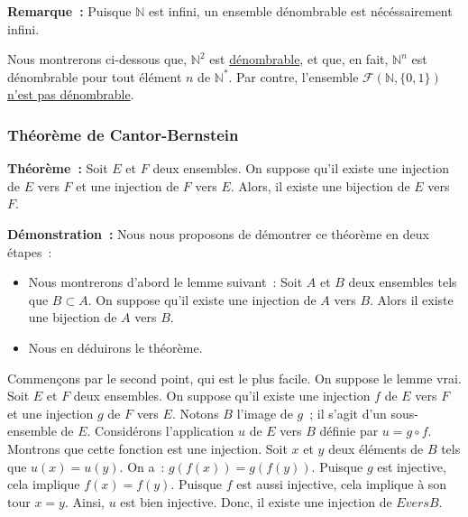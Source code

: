 \medskip

\noindent\textbf{Remarque :} Puisque $\mathbb{N}$ est infini, un ensemble dénombrable est nécéssairement infini.

\medskip

Nous montrerons ci-dessous que, $\mathbb{N}^2$ est \hyperlink{N_to_N2}{dénombrable}, et que, en fait, $\mathbb{N}^n$ est dénombrable pour tout élément $n$ de $\mathbb{N}^*$. 
Par contre, l'ensemble $\mathcal{F}\left( \mathbb{N}, \lbrace 0, 1 \rbrace \right)$ \hyperlink{F_N_0_1_non_denombrable}{n'est pas dénombrable}.

\subsubsection{Théorème de Cantor-Bernstein}

\noindent\textbf{Théorème :} Soit $E$ et $F$ deux ensembles. On suppose qu'il existe une injection de $E$ vers $F$ et une injection de $F$ vers $E$. 
    Alors, il existe une bijection de $E$ vers $F$.

\medskip

\noindent\textbf{Démonstration :} 
    Nous nous proposons de démontrer ce théorème en deux étapes : 
    \begin{itemize}[nosep]
        \item Nous montrerons d'abord le lemme suivant : Soit $A$ et $B$ deux ensembles tels que $B \subset A$. 
            On suppose qu'il existe une injection de $A$ vers $B$. 
            Alors il existe une bijection de $A$ vers $B$. 
        \item Nous en déduirons le théorème.
    \end{itemize}
    
    Commençons par le second point, qui est le plus facile. 
    On suppose le lemme vrai. 
    Soit $E$ et $F$ deux ensembles. 
    On suppose qu'il existe une injection $f$ de $E$ vers $F$ et une injection $g$ de $F$ vers $E$.
    Notons $B$ l'image de $g$ ; il s'agit d'un sous-ensemble de $E$. 
    Considérons l'application $u$ de $E$ vers $B$ définie par $u = g \circ f$. 
    Montrons que cette fonction est une injection. 
    Soit $x$ et $y$ deux éléments de $B$ tels que $u(x) = u(y)$. 
    On a : $g(f(x)) = g(f(y))$. 
    Puisque $g$ est injective, cela implique $f(x) = f(y)$. 
    Puisque $f$ est aussi injective, cela implique à son tour $x = y$. 
    Ainsi, $u$ est bien injective. 
    Donc, il existe une injection de $E vers B$.

